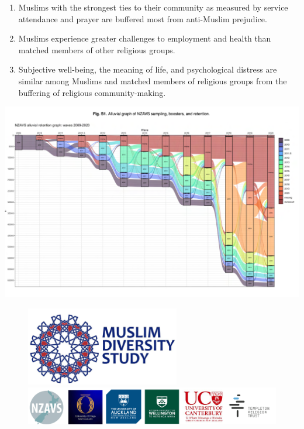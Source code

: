 \documentclass[
  ignorenonframetext,
  aspectratio=169,
]{beamer}
\begin{document}
\begin{frame}
\begin{enumerate}
\item
  Muslims with the strongest ties to their community as measured by
  service attendance and prayer are buffered most from anti-Muslim
  prejudice.
\item
  Muslims experience greater challenges to employment and health than
  matched members of other religious groups.
\item
  Subjective well-being, the meaning of life, and psychological distress
  are similar among Muslims and matched members of religious groups from
  the buffering of religious community-making.
\end{enumerate}
\end{frame}

\begin{frame}
\includegraphics{figs/alluvial.png}
\end{frame}

\begin{frame}
\begin{figure}

\begin{minipage}{\linewidth}
\begin{center}
\includegraphics[width=0.6\textwidth,height=\textheight]{figs/mds.png}
\end{center}
\end{minipage}%
\newline
\begin{minipage}{\linewidth}
\includegraphics{figs/sponsors.png}\end{minipage}%

\end{figure}%
\end{frame}
\end{document}
